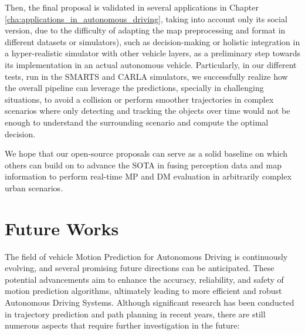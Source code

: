 Then, the final proposal is validated in several applications in Chapter \ref{cha:applications_in_autonomous_driving}, taking into account only its social version, due to the difficulty of adapting the map preprocessing and format in different datasets or simulators), such as decision-making or holistic integration in a hyper-realistic simulator with other vehicle layers, as a preliminary step towards its implementation in an actual autonomous vehicle. Particularly, in our different tests, run in the SMARTS and CARLA simulators, we successfully realize how the overall pipeline can leverage the predictions, specially in challenging situations, to avoid a collision or perform smoother trajectories in complex scenarios where only detecting and tracking the objects over time would not be enough to understand the surrounding scenario and compute the optimal decision.

We hope that our open-source proposals can serve as a solid baseline on which others can build on to advance the \acf{SOTA} in fusing perception data and map information to perform real-time \acf{MP} and \acf{DM} evaluation in arbitrarily complex urban scenarios. 

\section{Future Works}
\label{sec:9_future_works}

The field of vehicle Motion Prediction for Autonomous Driving is continuously evolving, and several promising future directions can be anticipated. These potential advancements aim to enhance the accuracy, reliability, and safety of motion prediction algorithms, ultimately leading to more efficient and robust Autonomous Driving Systems. Although significant research has been conducted in trajectory prediction and path planning in recent years, there are still numerous aspects that require further investigation in the future:


